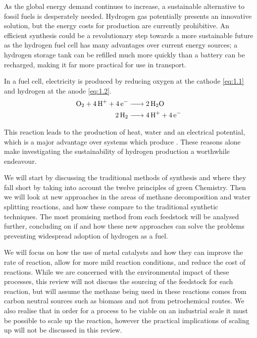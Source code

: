 As the global energy demand continues to increase, a sustainable alternative to fossil fuels is desperately needed.
Hydrogen gas potentially presents an innovative solution, but the energy costs for production are currently prohibitive.
An efficient synthesis could be a revolutionary step towards a more sustainable future as the hydrogen fuel cell has many advantages over current energy sources; a hydrogen storage tank can be refilled much more quickly than a battery can be recharged\cite{Offer2010}, making it far more practical for use in transport.

In a fuel cell, electricity is produced by reducing oxygen at the cathode \eqref{eq:1.1} and hydrogen at the anode \eqref{eq:1.2}.
\begin{align}
	\ce{O_2 + 4H+ + 4e- &-> 2H2O}	\label{eq:1.1}\\
	\ce{2H2 &-> 4H+ + 4e-} 		\label{eq:1.2}
\end{align}

This reaction leads to the production of heat, water and an electrical potential\cite{6278114}, which is a major advantage over systems which produce .
These reasons alone make investigating the sustainability of hydrogen production a worthwhile endeavour.

We will start by discussing the traditional methods of synthesis and where they fall short by taking into account the twelve principles of green Chemistry\cite{Saxena2011}.
Then we will look at new approaches in the areas of methane decomposition and water splitting reactions, and how these compare to the traditional synthetic techniques.
The most promising method from each feedstock will be analysed further, concluding on if and how these new approaches can solve the problems preventing widespread adoption of hydrogen as a fuel.

We will focus on how the use of metal catalysts and how they can improve the rate of reaction, allow for more mild reaction conditions, and reduce the cost of reactions.
While we are concerned with the environmental impact of these processes, this review will not discuss the sourcing of the feedstock for each reaction, but will assume the methane being used in these reactions comes from carbon neutral sources such as biomass\cite{Probstein1982} and not from petrochemical routes.
We also realise that in order for a process to be viable on an industrial scale it must be possible to scale up the reaction, however the practical implications of scaling up will not be discussed in this review.
